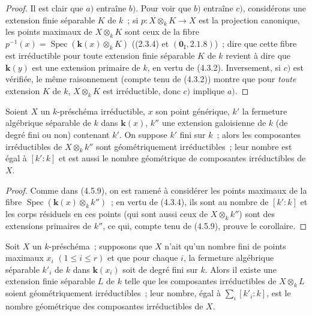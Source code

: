 \begin{proof}
Il est clair que $a)$ entraîne $b)$. Pour voir que $b)$ entraîne $c)$,
considérons une extension finie séparable $K$ de $k$~; si
$p:X\otimes_k K\to X$ est la projection canonique, les
points maximaux de $X\otimes_k K$ sont ceux de la fibre
$p^{-1}(x)=\operatorname{Spec}(\boldsymbol{k}(x)\otimes_k K)$ ((2.3.4) et
$(\mathbf{0}_{\mathrm I},2.1.8)$)~; dire que cette fibre est irréductible pour toute
extension finie séparable $K$ de $k$ revient à dire que $\boldsymbol{k}(y)$ est une
extension primaire de $k$, en vertu de (4.3.2). Inversement, si $c)$ est
vérifiée, le même raisonnement (compte tenu de (4.3.2)) montre que pour \emph{toute}
extension $K$ de $k$, $X\otimes_k K$ est irréductible, donc $c)$ implique
$a)$.
\end{proof}

\begin{corollary}[4.5.10]
\label{IV.2.4.5.10-fr}
Soient $X$ un $k$-préschéma irréductible, $x$ son point générique, $k'$ la
fermeture algébrique séparable de $k$ dans $\boldsymbol{k}(x)$, $k''$ une extension
galoisienne de $k$ (de degré fini ou non) contenant $k'$. On suppose $k'$ fini
sur $k$~; alors les composantes irréductibles de $X\otimes_k k''$ sont
géométriquement irréductibles~; leur nombre est égal à $[k':k]$ et est aussi le
nombre géométrique de composantes irréductibles de $X$.
\end{corollary}

\begin{proof}
Comme dans (4.5.9), on est ramené à considérer les points maximaux de la fibre
$\operatorname{Spec}(\boldsymbol{k}(x)\otimes_k k'')$~; en vertu de (4.3.4), ils sont au
nombre de $[k':k]$ et les corps résiduels en ces points (qui sont aussi ceux de
$X\otimes_k k''$) sont des extensions primaires de $k''$, ce qui, compte tenu
de (4.5.9), prouve le corollaire.
\end{proof}

\begin{corollary}[4.5.11]
Soit $X$ un $k$-préschéma~; supposons que $X$ n'ait qu'un nombre fini de
points maximaux $x_i$ $(1\leqslant i\leqslant r)$ et que pour chaque $i$, la
fermeture algébrique séparable $k'_i$ de $k$ dans $\boldsymbol{k}(x_i)$ soit de degré fini
sur $k$. Alors il existe une extension finie séparable $L$ de $k$ telle que les
composantes irréductibles de $X\otimes_k L$ soient géométriquement
irréductibles~; leur nombre, égal à $\sum_i[k'_i:k]$, est le nombre géométrique
des composantes irréductibles de $X$.
\end{corollary}

